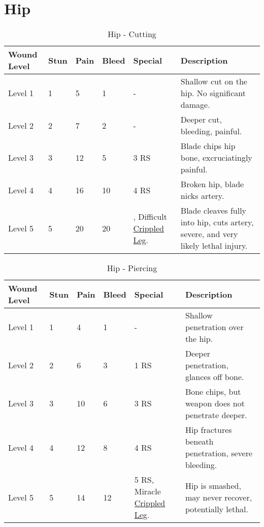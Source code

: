 \documentclass[oneside,11pt,english]{book}
\begin{document}
\section{Hip} \vspace{-25pt} \label{sec:hip}
\begin{table}[hb] %
	\caption{Hip - Cutting}
	\label{wound:Hip - Cutting}
	\begin{tabu} to 
Wound Level &Stun &Pain &Bleed &Special &Description\\\toprule
Level 1& 1& 5& 1& - &Shallow cut on the hip. No significant damage.\\
Level 2& 2& 7& 2& - &Deeper cut, bleeding, painful.\\
Level 3& 3& 12& 5&  3 RS &Blade chips hip bone, excruciatingly painful.\\
Level 4& 4& 16& 10&  4 RS &Broken hip, blade nicks artery.\\
Level 5& 5& 20& 20
	&, \newline
		Difficult~ \hyperref[bane:Crippled Limb/Appendage]{Crippled Leg}.
	&Blade cleaves fully into hip, cuts artery, severe, and very likely lethal injury.\\
	\end{tabu}
\end{table}

\begin{table}[hb] %
	\caption{Hip - Piercing}
	\label{wound:Hip - Piercing}
	\begin{tabu} to 
Wound Level &Stun &Pain &Bleed &Special &Description\\\toprule
Level 1& 1& 4& 1& - &Shallow penetration over the hip.\\
Level 2& 2& 6& 3&  1 RS &Deeper penetration, glances off bone.\\
Level 3& 3& 10& 6&  3 RS &Bone chips, but weapon does not penetrate deeper.\\
Level 4& 4& 12& 8&  4 RS &Hip fractures beneath penetration, severe bleeding.\\
Level 5& 5& 14& 12
	& 5 RS, \newline
		Miracle~ \hyperref[bane:Crippled Limb/Appendage]{Crippled Leg}.
	&Hip is smashed, may never recover, potentially lethal.\\
	\end{tabu}
\end{table}
\end{document}
